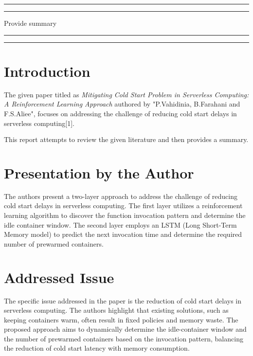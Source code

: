 
\newpage

\begin{flushright}
    \vspace{10cm}
    \rule{18cm}{5pt}
    \rule{18cm}{2pt}\vskip1cm
    \begin{center}
    \begin{bfseries}
        \Huge{Provide summary}\\
    \end{bfseries}
    \end{center}
    \vspace{1cm}
    \rule{18cm}{2pt}
    \rule{18cm}{5pt}
\end{flushright}
\clearpage
\chapter{Introduction}
\label{chp:1}

The given paper titled as \textit{Mitigating Cold Start Problem in Serverless	Computing: A Reinforcement Learning Approach} authored by "P.Vahidinia, B.Farahani and F.S.Aliee", focuses on addressing the challenge of reducing cold start delays in serverless computing[1].

This report attempts to review the given literature and then provides a summary.
\let\clearpage\relax
\chapter{Presentation by the Author}
\label{chp:2}
The authors present a two-layer approach to address the challenge of reducing cold start delays in serverless computing. The first layer utilizes a reinforcement learning algorithm to discover the function invocation pattern and determine the idle container window. The second layer employs an LSTM (Long Short-Term Memory model) to predict the next invocation time and determine the required number of prewarmed containers.
\chapter{Addressed Issue}
\label{chp:3}
The specific issue addressed in the paper is the reduction of cold start delays in serverless computing. The authors highlight that existing solutions, such as keeping containers warm, often result in fixed policies and memory waste. The proposed approach aims to dynamically determine the idle-container window and the number of prewarmed containers based on the invocation pattern, balancing the reduction of cold start latency with memory consumption.
